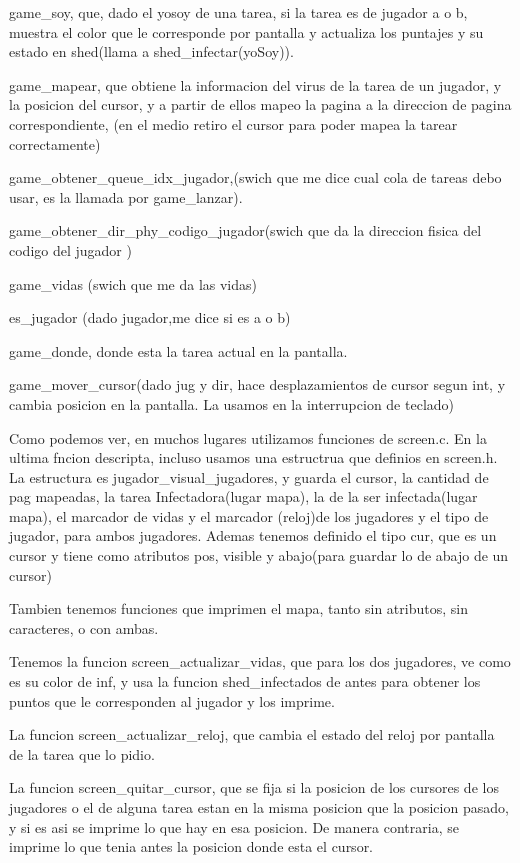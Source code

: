 \documentclass[a4paper]{article}
\begin{document}
 
game_soy, que, dado el yosoy de una tarea, si la tarea es de jugador a o b, muestra el color que le corresponde por pantalla y actualiza los puntajes y su estado en shed(llama a shed_infectar(yoSoy)).

game_mapear, que obtiene la informacion del  virus de la tarea de un jugador, y la posicion del cursor, y a partir de ellos mapeo la pagina a la direccion de pagina correspondiente, (en el medio retiro el cursor para poder mapea la tarear correctamente)
 

game_obtener_queue_idx_jugador,(swich que me dice cual cola de tareas debo usar, es la llamada por game_lanzar).


game_obtener_dir_phy_codigo_jugador(swich que da la direccion fisica del codigo  del jugador )

game_vidas (swich que me da las vidas)

es_jugador (dado jugador,me dice si es a o  b)

game_donde, donde esta la tarea actual en la pantalla.

game_mover_cursor(dado jug y dir, hace desplazamientos de cursor segun int, y cambia posicion en la pantalla. La usamos en la interrupcion de teclado)

Como podemos ver, en muchos lugares utilizamos funciones de screen.c. En la ultima fncion descripta,  incluso usamos una estructrua que definios en screen.h.
La estructura es jugador_visual_jugadores, y guarda el cursor, la cantidad de pag mapeadas, la tarea Infectadora(lugar mapa), la de la ser infectada(lugar mapa), el marcador de vidas y el marcador (reloj)de los jugadores y el tipo de jugador, para ambos jugadores.
Ademas tenemos definido el tipo cur, que es un cursor y tiene como atributos pos, visible y abajo(para guardar lo de abajo de un cursor)

Tambien tenemos funciones que imprimen el mapa, tanto sin atributos, sin caracteres, o con ambas.

Tenemos la funcion screen_actualizar_vidas, que para los dos jugadores, ve como es su color de inf, y usa la funcion shed_infectados de antes para obtener los puntos que le corresponden al jugador y los imprime.

La funcion screen_actualizar_reloj, que cambia el estado del reloj por pantalla de la tarea que lo pidio.

La funcion screen_quitar_cursor, que se fija si la posicion de los cursores de los jugadores  o el de alguna tarea estan en la misma posicion que la posicion pasado, y si es asi se imprime lo que hay en esa posicion. De manera contraria, se imprime lo que tenia antes la posicion donde esta el cursor.
\end{document}

